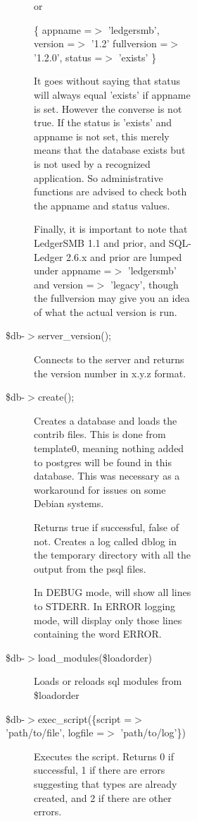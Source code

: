 \begin{description}
\begin{description}
\begin{description}
\begin{description}
\begin{description}
\begin{description}
\begin{description}
or



\{   appname =$>$ 'ledgersmb',
    version =$>$ '1.2'
fullversion =$>$ '1.2.0',
     status =$>$ 'exists' \}



It goes without saying that status will always equal 'exists' if appname is set.
However the converse is not true.  If the status is 'exists' and appname is not
set, this merely means that the database exists but is not used by a recognized
application.  So administrative functions are advised to check both the appname
and status values.



Finally, it is important to note that LedgerSMB 1.1 and prior, and SQL-Ledger 
2.6.x and prior are lumped under appname =$>$ 'ledgersmb' and version =$>$ 'legacy',
though the fullversion may give you an idea of what the actual version is run.


\item[{\$db-$>$server\_version();}] \mbox{}

Connects to the server and returns the version number in x.y.z format.


\item[{\$db-$>$create();}] \mbox{}

Creates a database and loads the contrib files.  This is done from template0, 
meaning nothing added to postgres will be found in this database.  This was 
necessary as a workaround for issues on some Debian systems.



Returns true if successful, false of not.  Creates a log called dblog in the 
temporary directory with all the output from the psql files.



In DEBUG mode, will show all lines to STDERR.  In ERROR logging mode, will 
display only those lines containing the word ERROR.


\item[{\$db-$>$load\_modules(\$loadorder)}] \mbox{}

Loads or reloads sql modules from \$loadorder


\item[{\$db-$>$exec\_script(\{script =$>$ 'path/to/file', logfile =$>$ 'path/to/log'\})}] \mbox{}

Executes the script.  Returns 0 if successful, 1 if there are errors suggesting
that types are already created, and 2 if there are other errors.



\end{description}
\end{description}
\end{description}
\end{description}
\end{description}
\end{description}
\end{description}
